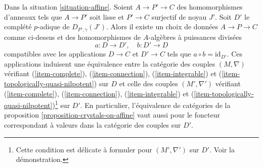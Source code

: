 \begin{lemma}
\label{lemma-crystals-on-affine-smooth}
Dans la situation \ref{situation-affine}.
Soient $A \to P' \to C$ des homomorphismes d'anneaux tels que $A \to P'$ soit lisse et $P' \to C$
surjectif de noyau $J'$. Soit $D'$ le complété $p$-adique de
$D_{P', \gamma}(J')$. Alors il existe un choix de données $A \to P \to C$
comme ci-dessus et des homomorphismes de $A$-algèbres à puissances divisées
$$
a : D \longrightarrow D',\quad b : D' \longrightarrow D
$$
compatibles avec les applications $D \to C$ et $D' \to C$ tels que
$a \circ b = \text{id}_{D'}$. Ces applications induisent
une équivalence entre la catégorie des couples $(M, \nabla)$ vérifiant
(\ref{item-complete}), (\ref{item-connection}),
(\ref{item-integrable}) et (\ref{item-topologically-quasi-nilpotent})
sur $D$ et celle des couples $(M', \nabla')$ vérifiant
(\ref{item-complete}), (\ref{item-connection}),
(\ref{item-integrable}) et
(\ref{item-topologically-quasi-nilpotent})\footnote{Cette condition
est délicate à formuler pour $(M', \nabla')$ sur $D'$. Voir la démonstration.} sur $D'$.
En particulier, l'équivalence de catégories de la
proposition \ref{proposition-crystals-on-affine}
vaut aussi pour le foncteur correspondant à valeurs dans la catégorie des couples sur $D'$.
\end{lemma}

